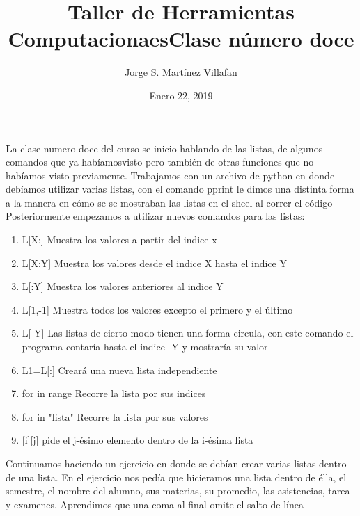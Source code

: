\documentclass[letterpaper, 12pt, oneside]{article}%
\title{\Huge Taller de Herramientas Computacionaes}
\author{Jorge S. Martínez Villafan}
\date{Enero 22, 2019}
\begin{document}
\maketitle
\newpage
\title{Clase número doce}

\textbf La clase numero doce del curso se inicio hablando de las listas, de algunos comandos que ya habíamosvisto pero también de otras funciones que no habíamos visto previamente. Trabajamos con un archivo de python en donde debíamos utilizar varias listas, con el comando \color{blue} pprint \color{black} le dimos una distinta forma a la manera en cómo se se mostraban las listas en el sheel al correr el código\\
Posteriormente empezamos a utilizar nuevos comandos para las listas: 
\begin{enumerate}
\item \color{green}L[X:] \color{orange} Muestra los valores a partir del indice x
\item \color{green} L[X:Y] \color{orange} Muestra los valores desde el indice X hasta el indice Y \color{black}
\item \color{green} L[:Y] \color{orange} Muestra los valores anteriores al indice Y \color{black} 
\item \color{green} L[1,-1] \color{orange} Muestra todos los valores excepto el primero y el último \color{black}
\item \color{green} L[-Y] \color{orange} Las listas de cierto modo tienen una forma circula, con este comando el programa contaría hasta el indice -Y y mostraría su valor \color{black}
\item L1=L[:] \color{orange} Creará una nueva lista independiente \color{black}
\item \color{green} for in range \color{orange} Recorre la lista por sus indices \color{black}
\item \color{green} for in "lista" \color{orange} Recorre la lista por sus valores \color{black}
\item \color{green} [i][j] \color{orange} pide el j-ésimo elemento dentro de la i-ésima lista 
\end{enumerate}
\color{black} Continuamos haciendo un ejercicio en donde se debían crear varias listas dentro de una lista. En el ejercicio nos pedía que hicieramos una lista dentro de élla, el semestre, el nombre del alumno, sus materias, su promedio, las asistencias, tarea y examenes. Aprendimos que una coma al final omite el salto de línea\\
\end{document}
